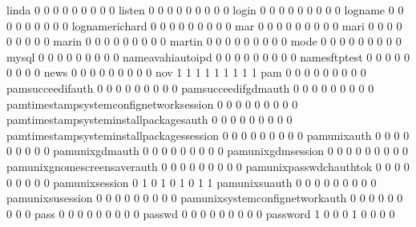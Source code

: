 \documentclass[compress,8pt]{beamer}
\begin{document}
\begin{frame}
\begin{Schunk}
  linda                                      0   0   0   0   0   0   0   0   0
  listen                                     0   0   0   0   0   0   0   0   0
  login                                      0   0   0   0   0   0   0   0   0
  logname                                    0   0   0   0   0   0   0   0   0
  lognamerichard                             0   0   0   0   0   0   0   0   0
  mar                                        0   0   0   0   0   0   0   0   0
  mari                                       0   0   0   0   0   0   0   0   0
  marin                                      0   0   0   0   0   0   0   0   0
  martin                                     0   0   0   0   0   0   0   0   0
  mode                                       0   0   0   0   0   0   0   0   0
  mysql                                      0   0   0   0   0   0   0   0   0
  nameavahiautoipd                           0   0   0   0   0   0   0   0   0
  namesftptest                               0   0   0   0   0   0   0   0   0
  news                                       0   0   0   0   0   0   0   0   0
  nov                                        1   1   1   1   1   1   1   1   1
  pam                                        0   0   0   0   0   0   0   0   0
  pamsucceedifauth                           0   0   0   0   0   0   0   0   0
  pamsucceedifgdmauth                        0   0   0   0   0   0   0   0   0
  pamtimestampsystemconfignetworksession     0   0   0   0   0   0   0   0   0
  pamtimestampsysteminstallpackagesauth      0   0   0   0   0   0   0   0   0
  pamtimestampsysteminstallpackagessession   0   0   0   0   0   0   0   0   0
  pamunixauth                                0   0   0   0   0   0   0   0   0
  pamunixgdmauth                             0   0   0   0   0   0   0   0   0
  pamunixgdmsession                          0   0   0   0   0   0   0   0   0
  pamunixgnomescreensaverauth                0   0   0   0   0   0   0   0   0
  pamunixpasswdchauthtok                     0   0   0   0   0   0   0   0   0
  pamunixsession                             0   1   0   1   0   1   0   1   1
  pamunixsuauth                              0   0   0   0   0   0   0   0   0
  pamunixsusession                           0   0   0   0   0   0   0   0   0
  pamunixsystemconfignetworkauth             0   0   0   0   0   0   0   0   0
  pass                                       0   0   0   0   0   0   0   0   0
  passwd                                     0   0   0   0   0   0   0   0   0
  password                                   1   0   0   0   1   0   0   0   0

\end{Schunk}
\end{frame}
\end{document}
